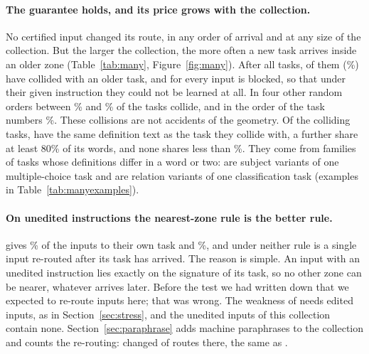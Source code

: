 \paragraph{The guarantee holds, and its price grows with the collection.} No certified input changed
its route, in any order of arrival and at any size of the collection. But the larger the
collection, the more often a new task arrives inside an older zone (Table~\ref{tab:many},
Figure~\ref{fig:many}). After all \ManyTasks{} tasks, \ManyColliding{} of them
(\ManyCollidingPct{}\%) have collided with an older task, and for \ManyAllHeld{} every input is
blocked, so that under their given instruction they could not be learned at all. In four other
random orders between \ManyCollidingPctLow{}\% and \ManyCollidingPctHigh{}\% of the tasks collide,
and in the order of the task numbers \ManyNumericCollidingPct{}\%. These collisions are not
accidents of the geometry. Of the \ManyColliding{} colliding tasks, \ManySameText{} have the same
definition text as the task they collide with, a further \ManyAlikeHigh{} share at least 80\% of its words,
and none shares less than \ManyAlikeLowest{}\%. They come from families
of tasks whose definitions differ in a word or two: \ManyFamilyMmlu{} are subject variants of one
multiple-choice task and \ManyFamilyAtomic{} are relation variants of one classification task
(examples in Table~\ref{tab:manyexamples}).

\paragraph{On unedited instructions the nearest-zone rule is the better rule.} \nearest{} gives
\ManyNearRightPct{}\% of the inputs to their own task and \cert{} \ManyCertRightPct{}\%, and under
neither rule is a single input re-routed after its task has arrived. The reason is simple. An
input with an unedited instruction lies exactly on the signature of its task, so no other zone can
be nearer, whatever arrives later. Before the test we had written down that we expected \nearest{}
to re-route inputs here; that was wrong. The weakness of \nearest{} needs edited inputs, as in
Section~\ref{sec:stress}, and the unedited inputs of this collection contain none. Section~\ref{sec:paraphrase} adds machine paraphrases to the collection and
counts the re-routing: \nearest{} changed \RerouteNearNChanged{} of \RerouteInputs{} routes there, the same as \cert{}.

